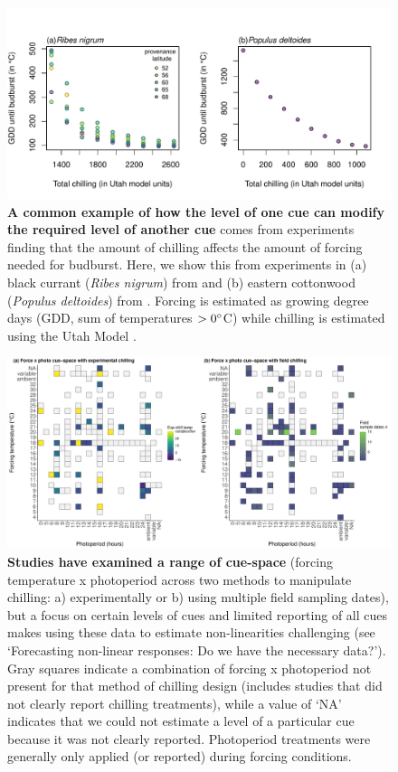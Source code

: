 \documentclass[11pt,letter]{article}
\begin{document}
\clearpage
\begin{figure}
\centering
\includegraphics[width=1\textwidth]{..//..//analyses/limitingcues/figures/gddbyutahpretty.pdf}
\caption{{\bf A common example of how the level of one cue can modify the required level of another cue} comes from experiments finding that the amount of chilling affects the amount of forcing needed for budburst. Here, we show this from experiments in (a)  black currant (\emph{Ribes nigrum}) from \citet{Sonsteby:2014aa} and (b) eastern cottonwood (\emph{Populus deltoides}) from \citet{Thielges:1976aa}. Forcing is estimated as growing degree days (GDD, sum of temperatures $>0\degree$C) while chilling is estimated using the Utah Model \citep[see][]{richardson1974}.} %
  \label{fig:gddbyutah} 
\end{figure}


\clearpage
\begin{figure}[t!]
\centering
\includegraphics[width=1.1\textwidth]{..//..//analyses/limitingcues/figures/heatmapphotoxforcexchill2panel.pdf}
\caption{{\bf Studies have examined a range of cue-space} (forcing temperature x photoperiod across two methods to manipulate chilling: a) experimentally or b) using multiple field sampling dates), but a focus on certain levels of cues and limited reporting of all cues makes using these data to estimate non-linearities challenging (see `Forecasting non-linear responses: Do we have the necessary data?'). Gray squares indicate a combination of forcing x photoperiod not present for that method of chilling design (includes studies that did not clearly report chilling treatments), while a value of `NA' indicates that we could not estimate a level of a particular cue because it was not clearly reported. Photoperiod treatments were generally only applied (or reported) during forcing conditions.}
  \label{fig:heatmaps} 
\end{figure}
\end{document}
